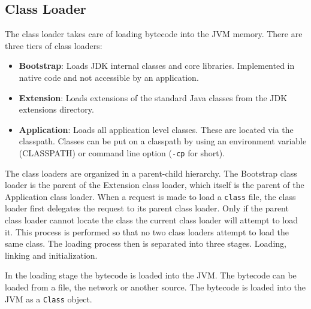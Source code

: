 \subsection{Class Loader}

The class loader takes care of loading bytecode into the JVM memory. There are three tiers of class loaders:

\begin{itemize}
    \item \textbf{Bootstrap}: Loads JDK internal classes and core libraries. Implemented in native code and not accessible by an application. 
    \item \textbf{Extension}: Loads extensions of the standard Java classes from the JDK extensions directory. 
    \item \textbf{Application}: Loads all application level classes. These are located via the classpath. Classes can be put on a classpath by using an environment variable (CLASSPATH) or command line option (\verb|-cp| for short). 
\end{itemize}

The class loaders are organized in a parent-child hierarchy. The Bootstrap class loader is the parent of the Extension class loader, which itself is the parent of the Application class loader. When a request is made to load a \texttt{class} file, the class loader first delegates the request to its parent class loader. Only if the parent class loader cannot locate the class the current class loader will attempt to load it. This process is performed so that no two class loaders attempt to load the same class. The loading process then is separated into three stages. Loading, linking and initialization.

In the loading stage the bytecode is loaded into the JVM. The bytecode can be loaded from a file, the network or another source. The bytecode is loaded into the JVM as a \texttt{Class} object.

